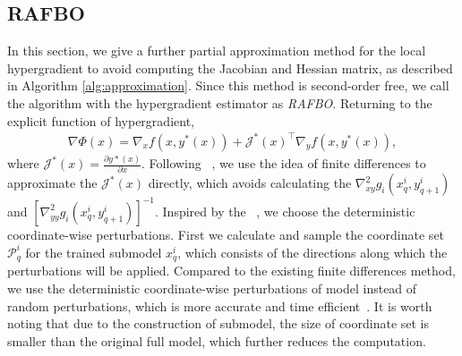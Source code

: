 \documentclass[lettersize,journal]{IEEEtran}
\begin{document}
\subsection{RAFBO}\label{sec:rafbo}
In this section, we give a further partial approximation method for the local hypergradient to avoid
computing the Jacobian and Hessian matrix, as described in Algorithm \ref{alg:approximation}. Since this method is second-order free, we call the algorithm with the hypergradient estimator as \textit{RAFBO}.
Returning to the explicit function of hypergradient,
\begin{align}
    \nabla\Phi(x) = \nabla_x f(x,y^*(x))+\mathcal{J}^*(x)^\top\nabla_y f(x,y^*(x)),
\end{align}
where $\mathcal{J}^*(x)=\frac{\partial y*(x)}{\partial x}$. Following ~\cite{pzobo}, we use the idea of finite differences to approximate the $\mathcal{J}^*(x)$ directly, which avoids calculating the $\nabla^2_{xy} g_i(x_q^i, y_{q+1}^i)$ and $[\nabla^2_{yy} g_i(x_q^i, y_{q+1}^i)]^{-1}$. Inspired by the ~\cite{lian2016comprehensive, liu2020primer}, we choose the deterministic coordinate-wise perturbations. First we calculate and sample the coordinate set \( \mathcal{P}_q^i \) for the trained submodel \( x_q^i \), which consists of the directions along which the perturbations will be applied. Compared to the existing finite differences method, we use the deterministic coordinate-wise perturbations of model instead of random perturbations, which is more accurate and time efficient~\cite{chen2024deepzero}.
It is worth noting that due to the construction of submodel, the size of coordinate set is smaller than the original full model, which further reduces the computation. 
\end{document}
